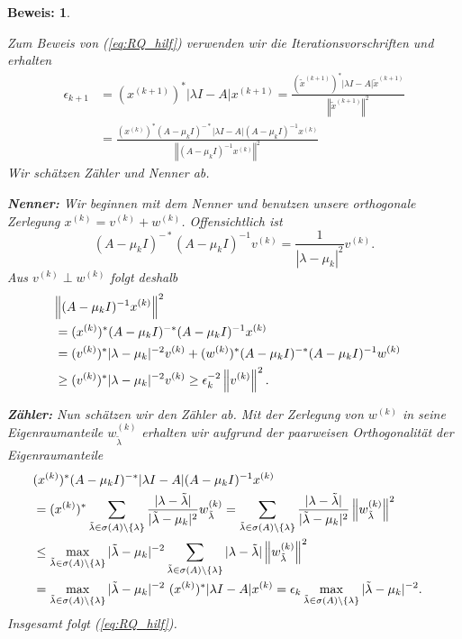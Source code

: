 \documentclass[12pt,a4paper]{book}
\theoremstyle{break}
\theoremstyle{nonumberplain}
\newtheorem{beweis}{Beweis:}
\newcommand{\R}{\mathbbm R}
\newcommand{\norm}[1]{\left\Vert#1\right\Vert}		%
\newcommand{\1}{\mathbbm{1}} 			      	%
\newcommand{\req}[1]{(\ref{eq:#1})}
\begin{document}
\begin{beweis}
\begin{enumerate}[(a)]
Zum Beweis von \req{RQ_hilf} verwenden wir die Iterationsvorschriften und erhalten %
\begin{align*}
\epsilon_{k+1}&=(x^{(k+1)})^* |\lambda I -  A| x^{(k+1)} 
= \frac{ (\tilde x^{(k+1)})^* |\lambda I -  A| \tilde x^{(k+1)}}{  \norm{\tilde x^{(k+1)}}^2 }\\
&= \frac{ (x^{(k)})^* (A-\mu_{k} I)^{-*}  | \lambda I -  A | (A-\mu_{k} I)^{-1} x^{(k)}}
{  \norm{ (A-\mu_{k} I)^{-1} x^{(k)} }^2}
\end{align*}
Wir schätzen Zähler und Nenner ab. 

\textbf{Nenner:} Wir beginnen mit dem Nenner und benutzen unsere orthogonale Zerlegung $x^{(k)}=v^{(k)} + w^{(k)}$.
Offensichtlich ist 
\[
(A-\mu_{k} I)^{-*} (A-\mu_{k} I)^{-1} v^{(k)}=\frac{1}{|\lambda-\mu_k|^2} v^{(k)}.
\]
Aus $v^{(k)}\perp w^{(k)}$ folgt deshalb
\begin{align*}
\lefteqn{\norm{ (A-\mu_{k} I)^{-1} x^{(k)} }^2}\\
&=  {(x^{(k)})^* (A-\mu_{k} I)^{-*} (A-\mu_{k} I)^{-1} x^{(k)}}\\
& = {(v^{(k)})^* | \lambda-\mu_{k} |^{-2} v^{(k)}} + {(w^{(k)})^* (A-\mu_{k} I)^{-*} (A-\mu_{k} I)^{-1} w^{(k)}}\\
& \geq {(v^{(k)})^* |\lambda-\mu_{k}|^{-2} v^{(k)}} \geq \epsilon_k^{-2} \norm{v^{(k)}}^2.
\end{align*}

\textbf{Zähler:} Nun schätzen wir den Zähler ab. Mit der Zerlegung von $w^{(k)}$ in seine Eigenraumanteile $w^{(k)}_{\tilde \lambda}$
erhalten wir aufgrund der paarweisen Orthogonalität der Eigenraumanteile
\begin{align*}
\lefteqn{(x^{(k)})^* (A-\mu_{k} I)^{-*}  | \lambda I -  A | (A-\mu_{k} I)^{-1} x^{(k)}}\\
&=(x^{(k)})^*  \sum_{\tilde \lambda\in \sigma(A)\setminus \{\lambda\} } \frac{|\lambda-\tilde \lambda|}{|\tilde\lambda-\mu_k|^2} w^{(k)}_{\tilde \lambda}
= \sum_{\tilde \lambda\in \sigma(A)\setminus \{\lambda\} } \frac{|\lambda-\tilde \lambda|}{ | \tilde\lambda-\mu_k |^2} \norm{w^{(k)}_{\tilde \lambda}}^2\\
%
&\leq \max\limits_{ \tilde \lambda\in \sigma(A)\setminus \{\lambda\} } |\tilde\lambda-\mu_k|^{-2}
 \sum_{\tilde \lambda\in \sigma(A)\setminus \{\lambda\} } |\lambda-\tilde \lambda|  \norm{w^{(k)}_{\tilde \lambda}}^2\\
%
&= \max\limits_{ \tilde \lambda\in \sigma(A)\setminus \{\lambda\} } |\tilde\lambda-\mu_k|^{-2}\ 
{(x^{(k)})^* | \lambda I -  A | x^{(k)}}
= \epsilon_k \max\limits_{ \tilde \lambda\in \sigma(A)\setminus \{\lambda\} } |\tilde\lambda-\mu_k|^{-2}.
\end{align*}
Insgesamt folgt \req{RQ_hilf}.
\end{enumerate}
\end{beweis}
\end{document}
